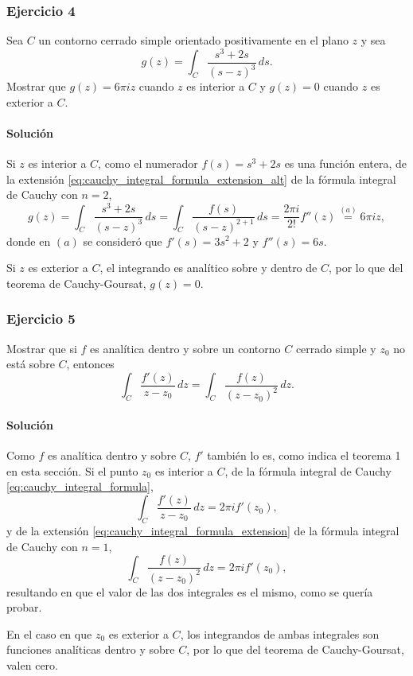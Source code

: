 \documentclass[a4paper]{report}
\begin{document}
\subsubsection*{Ejercicio 4}

Sea \(C\) un contorno cerrado simple orientado positivamente en el plano \(z\) y sea
\[
 g(z)=\int_C\frac{s^3+2s}{(s-z)^3}\,ds.
\]
Mostrar que \(g(z)=6\pi iz\) cuando \(z\) es interior a \(C\) y \(g(z)=0\) cuando \(z\) es exterior a \(C\).

\paragraph{Solución} Si \(z\) es interior a \(C\), como el numerador \(f(s)=s^3+2s\) es una función entera, de la extensión \ref{eq:cauchy_integral_formula_extension_alt} de la fórmula integral de Cauchy con \(n=2\),
\[
 g(z)=\int_C\frac{s^3+2s}{(s-z)^3}\,ds=\int_C\frac{f(s)}{(s-z)^{2+1}}\,ds=\frac{2\pi i}{2!}f''(z)\overset{(a)}{=}6\pi iz,
\]
donde en \((a)\) se consideró que \(f'(s)=3s^2+2\) y \(f''(s)=6s\).

Si \(z\) es exterior a \(C\), el integrando es analítico sobre y dentro de \(C\), por lo que del teorema de Cauchy-Goursat, \(g(z)=0\).

\subsubsection*{Ejercicio 5}

Mostrar que si \(f\) es analítica dentro y sobre un contorno \(C\) cerrado simple y \(z_0\) no está sobre \(C\), entonces
\[
 \int_C\frac{f'(z)}{z-z_0}\,dz=\int_C\frac{f(z)}{(z-z_0)^2}\,dz.
\]

\paragraph{Solución} Como \(f\) es analítica dentro y sobre \(C\), \(f'\) también lo es, como indica el teorema 1 en esta sección. Si el punto \(z_0\) es interior a \(C\), de la fórmula integral de Cauchy \ref{eq:cauchy_integral_formula},
\[
 \int_C\frac{f'(z)}{z-z_0}\,dz=2\pi if'(z_0),
\]
y de la extensión \ref{eq:cauchy_integral_formula_extension} de la fórmula integral de Cauchy con \(n=1\),
\[
 \int_C\frac{f(z)}{(z-z_0)^2}\,dz=2\pi if'(z_0),
\]
resultando en que el valor de las dos integrales es el mismo, como se quería probar.

En el caso en que \(z_0\) es exterior a \(C\), los integrandos de ambas integrales son funciones analíticas dentro y sobre \(C\), por lo que del teorema de Cauchy-Goursat, valen cero.
\end{document}
